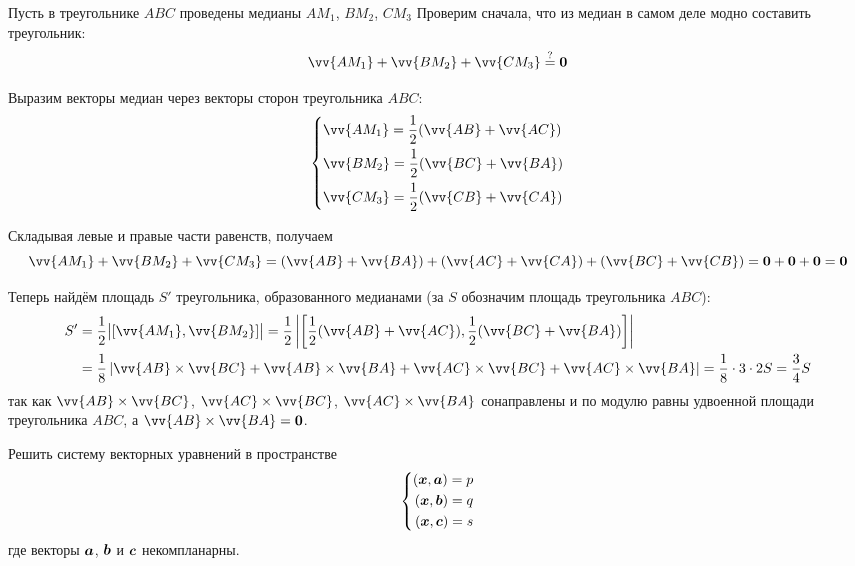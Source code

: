 \documentclass[a4paper,12pt]{article}
\begin{document}
  \begin{solution}
    
    Пусть в треугольнике $ABC$ проведены медианы $A M_1$, $B M_2$, $C M_3$
    Проверим сначала, что из медиан в самом деле модно составить треугольник:
    \[
      \vv{AM_1} + \vv{BM_2} + \vv{CM_3} \stackrel{\?}{=} \bds 0
    \]
    
    Выразим векторы медиан через векторы сторон треугольника $ABC$:
    \[
      \left\{
        \begin{aligned}
          &\vv{AM_1} = \frac{1}{2}(\vv{AB} + \vv{AC})\\
          &\vv{BM_2} = \frac{1}{2}(\vv{BC} + \vv{BA})\\
          &\vv{CM_3} = \frac{1}{2}(\vv{CB} + \vv{CA})
        \end{aligned}
      \right.
    \]
    
    Складывая левые и правые части равенств, получаем
    \[
      \vv{AM_1} + \vv{BM_2} + \vv{CM_3} = (\vv{AB} + \vv{BA}) + (\vv{AC} + \vv{CA}) + (\vv{BC} + \vv{CB})
      = \bds 0 + \bds 0 + \bds 0 = \bds 0
    \]
    
    Теперь найдём площадь $S'$ треугольника, образованного медианами (за $S$ обозначим площадь треугольника $ABC$):
    \begin{equation*}
    \begin{split}
      S' &= \frac{1}{2} \bigl|[\vv{AM_1}, \vv{BM_2}]\bigr|
      = \frac{1}{2} \left|\left[\frac{1}{2}(\vv{AB} + \vv{AC}), \frac{1}{2}(\vv{BC} + \vv{BA})\right]\right|\\
      &= \frac{1}{8} \left|\vv{AB} \times \vv{BC} + \vv{AB} \times \vv{BA} + \vv{AC} \times \vv{BC} + \vv{AC} \times \vv{BA}\right|
      = \frac{1}{8} \cdot 3 \cdot 2 S
      = \frac{3}{4} S
    \end{split}
    \end{equation*}
    так как $\vv{AB} \hm\times \vv{BC}$, $\vv{AC} \hm\times \vv{BC}$, $\vv{AC} \hm\times \vv{BA}$ сонаправлены и по модулю равны удвоенной площади треугольника $ABC$, а $\vv{AB} \hm\times \vv{BA} \hm= \bds 0$.
  \end{solution}
  
  
  \begin{problem}[3.31]
    Решить систему векторных уравнений в пространстве
    \[
      \left\{
        \begin{aligned}
          (\boldsymbol x, \boldsymbol a) = p\\
          (\boldsymbol x, \boldsymbol b) = q\\
          (\boldsymbol x, \boldsymbol c) = s
        \end{aligned}
      \right.
    \]
    где векторы $\boldsymbol a$, $\boldsymbol b$ и $\boldsymbol c$ некомпланарны.
  \end{problem}
  
\end{document}
